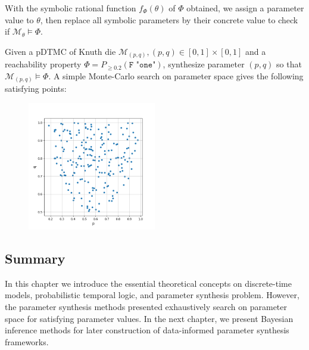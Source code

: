 With the symbolic rational function $f_\Phi(\theta)$ of $\Phi$ obtained, we assign a parameter value
to $\theta$, then replace all symbolic parameters by their concrete value to check if
$\mathcal{M}_\theta \models \Phi$.
\begin{example}
    Given a pDTMC of Knuth die $\mathcal{M}_{(p,q)}, (p,q)\in[0,1]\times[0,1] $ and a reachability
    property $\Phi = P_{\geq 0.2} (\texttt{F "one"})$, synthesize parameter $(p,q)$ so that
    $\mathcal{M}_{(p,q)} \models \Phi$. A simple Monte-Carlo search on parameter space gives the
    following satisfying points:
    \begin{figure}[H]
        \centering
        \includegraphics[width=0.5\textwidth]{figures/knuth_die_trueparams.png}
        \label{fig:knuth-die-pq-trueparams}
    \end{figure}
\end{example}

\subsection{Summary}
In this chapter we introduce the essential theoretical concepts on discrete-time models,
probabilistic temporal logic, and parameter synthesis problem. However, the parameter synthesis
methods presented exhaustively search on parameter space for satisfying parameter values. In the
next chapter, we present Bayesian inference methods for later construction of data-informed
parameter synthesis frameworks.